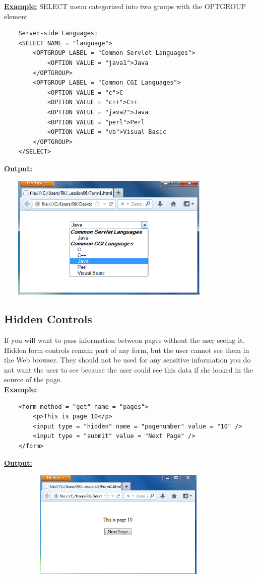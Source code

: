 \documentclass[11pt,a4paper]{article}
\begin{document}
\underline{\textbf{Example:}} SELECT menu categorized into two groups with the OPTGROUP element
\begin{verbatim}
    Server-side Languages:
    <SELECT NAME = "language">
        <OPTGROUP LABEL = "Common Servlet Languages">
            <OPTION VALUE = "java1">Java
        </OPTGROUP>
        <OPTGROUP LABEL = "Common CGI Languages">
            <OPTION VALUE = "c">C
            <OPTION VALUE = "c++">C++
            <OPTION VALUE = "java2">Java
            <OPTION VALUE = "perl">Perl
            <OPTION VALUE = "vb">Visual Basic
        </OPTGROUP>
    </SELECT>
\end{verbatim}
\underline{\textbf{Output:}}

\includegraphics[height = 60mm, width = 110mm]{Form11.png}
\subsection*{Hidden Controls}
If you will want to pass information between pages without the user seeing it. Hidden form controls remain part of any form, but the user cannot see them in the Web browser. They should not be used for any sensitive information you do not want the user to see because the user could see this data if she looked in the source of the page.\\

\underline{\textbf{Example:}}
\begin{verbatim}
    <form method = "get" name = "pages">
        <p>This is page 10</p>
        <input type = "hidden" name = "pagenumber" value = "10" />
        <input type = "submit" value = "Next Page" />
    </form>
\end{verbatim}
\underline{\textbf{Output:}}

\includegraphics[height = 52mm, width = 120mm]{Form12.png}
\end{document}
